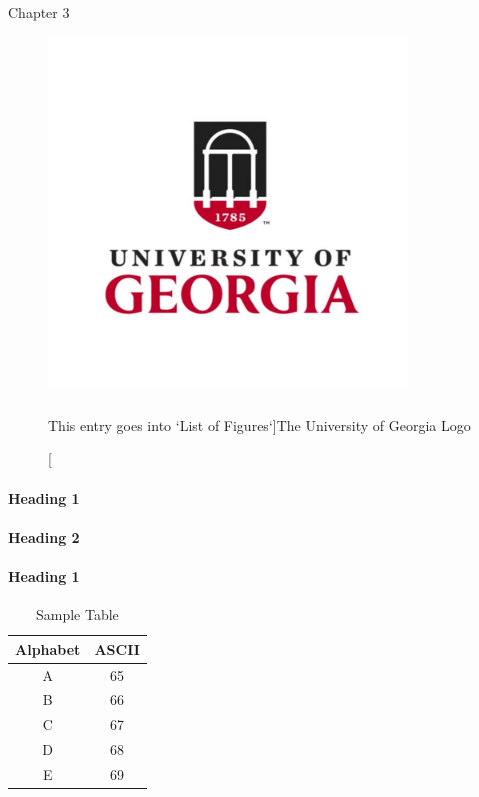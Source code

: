 \chapter{}{Chapter 3}

\begin{figure}[htbp]
    \begin{center}
    	\includegraphics[width=0.85\textwidth]{figures/fig1.jpg}
    	\label{fig:fig_uga} %
    	\caption[This entry goes into `List of Figures`]{The University of Georgia Logo}
    \end{center}
\end{figure}


\subsubsection*{Heading 1}

\subsubsection*{Heading 2}


\subsubsection*{Heading 1}
\begin{table}[h]
\begin{center}
    \label{Tab:table_sample}
    \caption{Sample Table}
    \begin{tabular}{ c c }
    	\toprule
    	Alphabet & ASCII \\
    	\midrule
    	A & 65 \\
    	B & 66 \\
    	C & 67 \\
    	D & 68 \\
    	E & 69 \\
    	\bottomrule
    \end{tabular}
\end{center}
\end{table}

